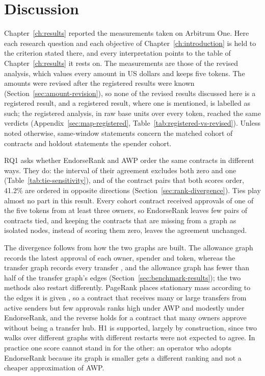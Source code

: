 \chapter{Discussion}
\label{ch:discussion}

Chapter~\ref{ch:results} reported the measurements taken on Arbitrum One. Here each research question and each objective of Chapter~\ref{ch:introduction} is held to the criterion stated there, and every interpretation points to the table of Chapter~\ref{ch:results} it rests on. The measurements are those of the revised analysis, which values every amount in US dollars and keeps five tokens. The amounts were revised after the registered results were known (Section~\ref{sec:amount-revision}), so none of the revised results discussed here is a registered result, and a registered result, where one is mentioned, is labelled as such; the registered analysis, in raw base units over every token, reached the same verdicts (Appendix~\ref{sec:map-registered}, Table~\ref{tab:registered-vs-revised}). Unless noted otherwise, same-window statements concern the matched cohort of contracts and holdout statements the spender cohort.



RQ1 asks whether EndorseRank and AWP order the same contracts in different ways. They do: the interval of their agreement excludes both zero and one (Table~\ref{tab:tie-sensitivity}), and of the contract pairs that both scores order, 41.2\% are ordered in opposite directions (Section~\ref{sec:rank-divergence}). Ties play almost no part in this result. Every cohort contract received approvals of one of the five tokens from at least three owners, so EndorseRank leaves few pairs of contracts tied, and keeping the contracts that are missing from a graph as isolated nodes, instead of scoring them zero, leaves the agreement unchanged.

The divergence follows from how the two graphs are built. The allowance graph records the latest approval of each owner, spender and token, whereas the transfer graph records every transfer \parencite{do2023awp}, and the allowance graph has fewer than half of the transfer graph's edges (Section~\ref{sec:benchmark-results}); the two methods also restart differently. PageRank places stationary mass according to the edges it is given \parencite{page1999pagerank}, so a contract that receives many or large transfers from active senders but few approvals ranks high under AWP and modestly under EndorseRank, and the reverse holds for a contract that many owners approve without being a transfer hub. H1 is supported, largely by construction, since two walks over different graphs with different restarts were not expected to agree. In practice one score cannot stand in for the other: an operator who adopts EndorseRank because its graph is smaller gets a different ranking and not a cheaper approximation of AWP.

